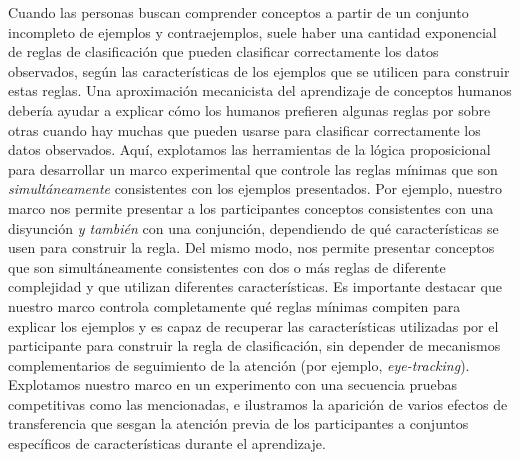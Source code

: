 Cuando las personas buscan comprender conceptos a partir de un conjunto incompleto de ejemplos y contraejemplos, suele haber una cantidad exponencial de reglas de clasificación que pueden clasificar correctamente los datos observados, según las características de los ejemplos que se utilicen para construir estas reglas. Una aproximación mecanicista del aprendizaje de conceptos humanos debería ayudar a explicar cómo los humanos prefieren algunas reglas por sobre otras cuando hay muchas que pueden usarse para clasificar correctamente los datos observados. Aquí, explotamos las herramientas de la lógica proposicional para desarrollar un marco experimental que controle las reglas mínimas que son \textit{simultáneamente} consistentes con los ejemplos presentados. Por ejemplo, nuestro marco nos permite presentar a los participantes conceptos consistentes con una disyunción \textit{y también} con una conjunción, dependiendo de qué características se usen para construir la regla. Del mismo modo, nos permite presentar conceptos que son simultáneamente consistentes con dos o más reglas de diferente complejidad y que utilizan diferentes características. Es importante destacar que nuestro marco controla completamente qué reglas mínimas compiten para explicar los ejemplos y es capaz de recuperar las características utilizadas por el participante para construir la regla de clasificación, sin depender de mecanismos complementarios de seguimiento de la atención (por ejemplo, {\em eye-tracking}). Explotamos nuestro marco en un experimento con una secuencia pruebas competitivas como las mencionadas, e ilustramos la aparición de varios efectos de transferencia que sesgan la atención previa de los participantes a conjuntos específicos de características durante el aprendizaje.

